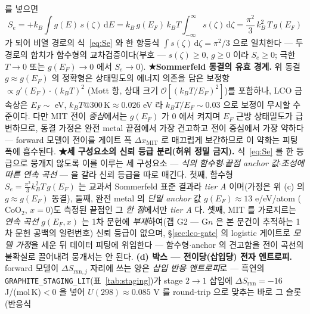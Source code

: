 \documentclass[11pt,a4paper]{article}
\newcommand{\dd}{\mathrm{d}}
\newcommand{\rxn}{\mathrm{rxn}}
\newcommand{\code}[1]{\texttt{#1}}
\begin{document}
를 넣으면
\begin{equation}
S_e=+k_B\int g(E)\,s(\zeta)\,\dd E
=k_B\,g(E_F)\,k_BT\!\int_{-\infty}^{\infty}\!s(\zeta)\,\dd\zeta
=\frac{\pi^2}{3}\,k_B^2\,T\,g(E_F)
\label{eq:Sedirect}
\end{equation}
가 되어 비열 경로의 식~\eqref{eq:Se} 와 한 항등식 $\int s(\zeta)\,\dd\zeta=\pi^2/3$ 으로 일치한다 — 두 경로의
합치가 함수형의 교차검증이다(부호 — $s(\zeta)\ge0$, $g\ge0$ 이라 $S_e\ge0$; 극한 $T\to0$ 또는 $g(E_F)\to0$ 에서
$S_e\to0$).
\textbf{★Sommerfeld 동결의 유효 경계.} 위 동결 $g\approx g(E_F)$ 의 정확형은 상태밀도의 에너지 의존을 담은 보정항 $\propto g'(E_F)\cdot(k_BT)^2$
(Mott 항, 상대 크기 $\mathcal O[(k_BT/E_F)^2]$)를 포함하나, LCO 금속상은 $E_F\sim$ eV, $k_BT@300\,\mathrm K
\approx0.026$ eV 라 $k_BT/E_F\sim0.03$ 으로 보정이 무시할 수준이다. 다만 MIT 전이 \emph{중심}에서는 $g(E_F)$
가 0 에서 켜지며 $E_F$ 근방 상태밀도가 급변하므로, 동결 가정은 완전 metal 끝점에서 가장 견고하고 전이 중심에서
가장 약하다 — forward 모델이 전이를 게이트 폭 $\Delta x_\mathrm{MIT}$ 로 매끄럽게 보간하므로 이 약화는 피팅 폭에
흡수된다. \textbf{★세 구성요소의 신뢰 등급 분리(허위 정밀 금지).}
식~\eqref{eq:Se} 를 한 등급으로 뭉개지 않도록 이를 이루는 세 구성요소 — \emph{식의 함수형}$\cdot$\emph{끝점
anchor 값}$\cdot$\emph{조성에 따른 연속 곡선} — 을 갈라 신뢰 등급을 따로 매긴다. 첫째, 함수형
$S_e=\tfrac{\pi^2}{3}k_B^2T\,g(E_F)$ 는 교과서 Sommerfeld 표준 결과라 \emph{tier A} 이며(가정은 위 (c) 의
$g\!\approx\!g(E_F)$ 동결), 둘째, 완전 metal 의 \emph{단일 anchor} 값 $g(E_F)\!\approx\!13$ e/eV/atom
($\mathrm{CoO_2}$, $x{=}0$)도 측정된 끝점인 그 \emph{한 점}에서만 \emph{tier A} 다\cite{motohashi2009}. 셋째,
MIT 를 가로지르는 \emph{연속 곡선} $g(E_F,x)$ 는 1차 문헌에 \emph{부재}하여(갭 G2 — G$n$ 은 본 문건이
추적하는 1차 문헌 공백의 일련번호) 신뢰 등급이 없으며,
\S\ref{sec:lco-gate} 의 logistic 게이트로 \emph{모델 가정}을 세운 뒤 데이터 피팅에 위임한다 — 함수형$\cdot$anchor
의 견고함을 전이 곡선의 불확실로 끌어내려 뭉개서는 안 된다. \textbf{(d) 박스 — 전이당(삽입당) 전자 엔트로피.} forward 모델이 $\Delta S_{\rxn,j}$ 자리에 쓰는 양은 \emph{삽입 반응 엔트로피}로 — 흑연의
\code{GRAPHITE\_STAGING\_LIT}(표~\ref{tab:staging})가 stage $2\!\to\!1$ 삽입에 $\Delta S_\rxn=-16$ J/(mol\,K)$<0$
을 넣어 $U(298)\approx0.085$ V 를 round-trip 으로 맞추는 바로 그 슬롯(반응식
\end{document}
